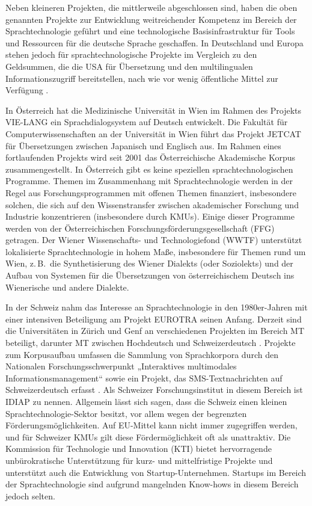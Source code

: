 \documentclass[]{../../metanetpaper}
\begin{document}
\begin{multicols}{2}
Neben kleineren Projekten, die mittlerweile abgeschlossen sind, haben die oben genannten Projekte zur Entwicklung weitreichender Kompetenz im Bereich der Sprachtechnologie geführt und eine technologische Basisinfrastruktur für Tools und Ressourcen für die deutsche Sprache geschaffen. In Deutschland und Europa stehen jedoch für sprachtechnologische Projekte im Vergleich zu den Geldsummen, die die USA für Übersetzung und den multilingualen Informationszugriff bereitstellen, nach wie vor wenig öffentliche Mittel zur Verfügung \cite{laz1}. 

In Österreich hat die Medizinische Universität in Wien im Rahmen des Projekts VIE-LANG ein Sprachdialogsystem auf Deutsch entwickelt. Die Fakultät für Computerwissenschaften an der Universität in Wien führt das Projekt JETCAT für Übersetzungen zwischen Japanisch und Englisch aus. Im Rahmen eines fortlaufenden Projekts wird seit 2001 das Österreichische Akademische Korpus zusammengestellt. In Österreich gibt es keine speziellen sprachtechnologischen Programme. Themen im Zusammenhang mit Sprachtechnologie werden in der Regel aus Forschungsprogrammen mit offenen Themen finanziert, insbesondere solchen, die sich auf den Wissenstransfer zwischen akademischer Forschung und Industrie konzentrieren (insbesondere durch KMUs). Einige dieser Programme werden von der Österreichischen Forschungsförderungsgesellschaft (FFG) getragen. Der Wiener Wissenschafts- und Technologiefond (WWTF) unterstützt lokalisierte Sprachtechnologie in hohem Maße, insbesondere für Themen rund um Wien, z.\,B.~die Synthetisierung des Wiener Dialekts (oder Soziolekts) und der Aufbau von Systemen für die Übersetzungen von österreichischem Deutsch ins Wienerische und andere Dialekte. 

In der Schweiz nahm das Interesse an Sprachtechnologie in den 1980er-Jahren mit einer intensiven Beteiligung am Projekt EUROTRA seinen Anfang. Derzeit sind die Universitäten in Zürich und Genf an verschiedenen Projekten im Bereich MT beteiligt, darunter MT zwischen Hochdeutsch und Schweizerdeutsch \cite{latl1}. Projekte zum Korpusaufbau umfassen die Sammlung von Sprachkorpora durch den Nationalen Forschungsschwerpunkt „Interaktives multimodales Informationsmanagement“ sowie ein Projekt, das SMS-Text\-nach\-rich\-ten auf Schweizerdeutsch erfasst \cite{sor1}.  Als Schweizer Forschungsinstitut in diesem Bereich ist IDIAP zu nennen. Allgemein lässt sich sagen, dass die Schweiz einen kleinen Sprachtechnologie-Sektor besitzt, vor allem wegen der begrenzten Förderungsmöglichkeiten. Auf EU-Mittel kann nicht immer zugegriffen werden, und für Schweizer KMUs gilt diese Fördermöglichkeit oft als unattraktiv. Die Kommission für Technologie und Innovation (KTI) bietet hervorragende unbürokratische Unterstützung für kurz- und mittelfristige Projekte und unterstützt auch die Entwicklung von Startup-Unternehmen. Startups im Bereich der Sprachtechnologie sind aufgrund mangelnden Know-hows in diesem Bereich jedoch selten.


\end{multicols}
\end{document}
